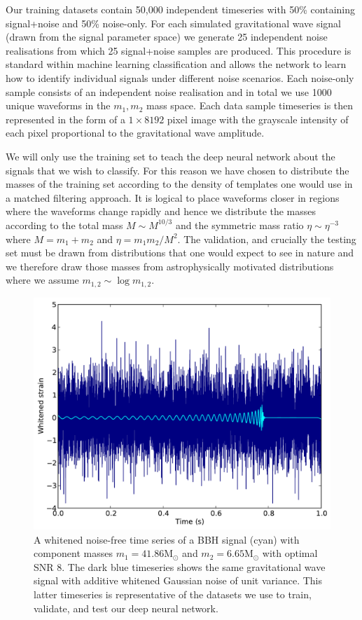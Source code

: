 \documentclass[%
 amsmath,amssymb,
 aps,
 twocolumn,
 prl,
 reprint,
floatfix,
]{revtex4-1}
\begin{document}
%
%
Our training datasets contain 50,000 independent timeseries with 50\% containing
signal+noise and 50\% noise-only. For each simulated gravitational wave signal
(drawn from the signal parameter space) we generate 25 independent noise
realisations from which 25 signal+noise samples are produced. This procedure is
standard within machine learning classification and allows the network to learn
how to identify individual signals under different noise scenarios. Each
noise-only sample consists of an independent noise realisation and in total we
use 1000 unique waveforms in the $m_{1},m_{2}$ mass space. Each data sample
timeseries is then represented in the form of a $1 \times 8192$ pixel image
with the grayscale intensity of each pixel proportional to the gravitational
wave amplitude.

%
%
We will only use the training set to teach the deep neural network about the
signals that we wish to classify. For this reason we have chosen to distribute
the masses of the training set according to the density of templates one would
use in a matched filtering approach. It is logical to place waveforms closer in
regions where the waveforms change rapidly and hence we distribute the masses
according to the total mass $M\sim M^{10/3}$ and the symmetric mass ratio
$\eta\sim \eta^{-3}$ where $M=m_{1}+m_{2}$ and $\eta=m_{1}m_{2}/M^{2}$. The
validation, and crucially the testing set must be drawn from distributions that
one would expect to see in nature and we therefore draw those masses from
astrophysically motivated distributions where we assume $m_{1,2}\sim
\log{m_{1,2}}$.   


\begin{figure} 
\includegraphics[width=\columnwidth]{figures/waveform.pdf}
\caption{\label{fig:waveform} A whitened noise-free time series of a \ac{BBH}
signal (cyan) with component masses $m_{1}=41.86\mathrm{M}_{\odot}$ and $m_{2}=6.65\mathrm{M}_{\odot}$
with optimal \ac{SNR} 8. The dark blue timeseries shows the
same gravitational wave signal with additive whitened Gaussian noise of unit
variance. This latter timeseries is representative of the datasets we use to
train, validate, and test our deep neural network.} 
\end{figure}
\end{document}
